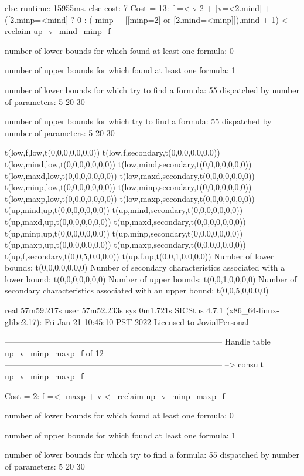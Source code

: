 else runtime: 15955ms. else cost: 7
Cost = 13:  f =< v-2 + [v=<2.mind] + ([2.minp=<mind] ? 0 : (-minp + [[minp=2] or [2.mind=<minp]]).mind + 1) %
<-- reclaim up_v_mind_minp_f

number of lower bounds for which found at least one formula: 0

number of upper bounds for which found at least one formula: 1

number of lower bounds for which try to find a formula: 55
dispatched by number of parameters: 5  20  30

number of upper bounds for which try to find a formula: 55
dispatched by number of parameters: 5  20  30

t(low,f,low,t(0,0,0,0,0,0,0))
t(low,f,secondary,t(0,0,0,0,0,0,0))
t(low,mind,low,t(0,0,0,0,0,0,0))
t(low,mind,secondary,t(0,0,0,0,0,0,0))
t(low,maxd,low,t(0,0,0,0,0,0,0))
t(low,maxd,secondary,t(0,0,0,0,0,0,0))
t(low,minp,low,t(0,0,0,0,0,0,0))
t(low,minp,secondary,t(0,0,0,0,0,0,0))
t(low,maxp,low,t(0,0,0,0,0,0,0))
t(low,maxp,secondary,t(0,0,0,0,0,0,0))
t(up,mind,up,t(0,0,0,0,0,0,0))
t(up,mind,secondary,t(0,0,0,0,0,0,0))
t(up,maxd,up,t(0,0,0,0,0,0,0))
t(up,maxd,secondary,t(0,0,0,0,0,0,0))
t(up,minp,up,t(0,0,0,0,0,0,0))
t(up,minp,secondary,t(0,0,0,0,0,0,0))
t(up,maxp,up,t(0,0,0,0,0,0,0))
t(up,maxp,secondary,t(0,0,0,0,0,0,0))
t(up,f,secondary,t(0,0,5,0,0,0,0))
t(up,f,up,t(0,0,1,0,0,0,0))
Number of lower bounds:                                             t(0,0,0,0,0,0,0)
Number of secondary characteristics associated with a lower bound:  t(0,0,0,0,0,0,0)
Number of upper bounds:                                             t(0,0,1,0,0,0,0)
Number of secondary characteristics associated with an upper bound: t(0,0,5,0,0,0,0)

real	57m59.217s
user	57m52.233s
sys	0m1.721s
SICStus 4.7.1 (x86_64-linux-glibc2.17): Fri Jan 21 10:45:10 PST 2022
Licensed to JovialPersonal


--------------------------------------------------------------------------------
Handle table up_v_minp_maxp_f of 12
--------------------------------------------------------------------------------
--> consult up_v_minp_maxp_f

Cost =  2:  f =< -maxp + v
<-- reclaim up_v_minp_maxp_f

number of lower bounds for which found at least one formula: 0

number of upper bounds for which found at least one formula: 1

number of lower bounds for which try to find a formula: 55
dispatched by number of parameters: 5  20  30

